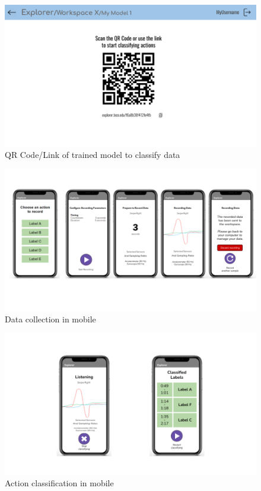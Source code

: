 \begin{figure}[ht]
    \centering
    \includegraphics[width = .98\textwidth]{mockups/11.png}
    \caption{QR Code/Link of trained model to classify data}
    \label{fig:model-link}
\end{figure}

\begin{figure}[ht]
    \centering
    \includegraphics[width = .98\textwidth]{mockups/12.png}
    \caption{Data collection in mobile}
    \label{fig:data-collection}
\end{figure}

\begin{figure}[ht]
    \centering
    \includegraphics[width = .98\textwidth]{mockups/13.png}
    \caption{Action classification in mobile}
    \label{fig:classification}
\end{figure}